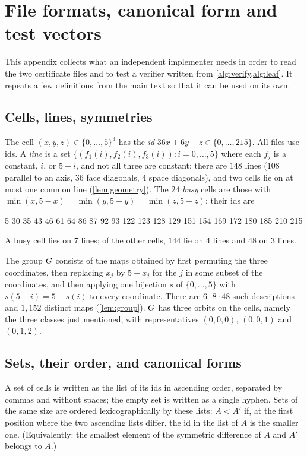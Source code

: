 \section{File formats, canonical form and test vectors}\label{sec:formats}


This appendix collects what an independent implementer needs in order to read the two certificate files
and to test a verifier written from \cref{alg:verify,alg:leaf}. It repeats a few definitions from the main
text so that it can be used on its own.

\subsection{Cells, lines, symmetries}\label{ssec:fmt-cells}

The cell $(x,y,z)\in\{0,\dots,5\}^3$ has the \emph{id} $36x+6y+z\in\{0,\dots,215\}$. All files use ids. A
\emph{line} is a set $\{(f_1(i),f_2(i),f_3(i)): i=0,\dots,5\}$ where each $f_j$ is a constant, $i$, or
$5-i$, and not all three are constant; there are $148$ lines ($108$ parallel to an axis, $36$ face diagonals,
$4$ space diagonals), and two cells lie on at most one common line (\cref{lem:geometry}). The $24$
\emph{busy} cells are those with $\min(x,5-x)=\min(y,5-y)=\min(z,5-z)$; their ids are
\begin{center}\small{} 5 30 35 43 46 61 64 86 87 92 93 122 123 128 129 151 154 169 172 180 185 210 215
\end{center}
A busy cell lies on $7$ lines; of the other cells, $144$ lie on $4$ lines and $48$ on $3$ lines.

The group $G$ consists of the maps obtained by first permuting the three coordinates, then replacing
$x_j$ by $5-x_j$ for the $j$ in some subset of the coordinates, and then applying one bijection $s$ of
$\{0,\dots,5\}$ with $s(5-i)=5-s(i)$ to every coordinate. There are $6\cdot 8\cdot 48$ such descriptions and
$1{,}152$ distinct maps (\cref{lem:group}). $G$ has three orbits on the cells, namely the three classes just
mentioned, with representatives $(0,0,0)$, $(0,0,1)$ and $(0,1,2)$.

\subsection{Sets, their order, and canonical forms}\label{ssec:fmt-canon}

A set of cells is written as the list of its ids in ascending order, separated by commas and without
spaces; the empty set is written as a single hyphen. Sets of the same size are ordered
lexicographically by these lists: $A<A'$ if, at the first position where the two ascending lists differ,
the id in the list of $A$ is the smaller one. (Equivalently: the smallest element of the symmetric
difference of $A$ and $A'$ belongs to $A$.)

